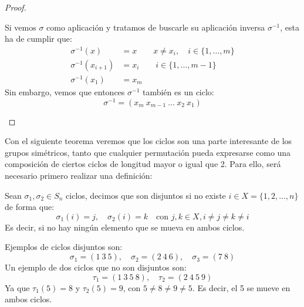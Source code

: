 \begin{prop}
\begin{proof}
\begin{enumerate}
                Si vemos $\sigma$ como aplicación y tratamos de buscarle su aplicación inversa $\sigma^{-1}$, esta ha de cumplir que:
                \begin{align*}
                    \sigma^{-1}(x) &= x \qquad x\neq x_i, \quad i \in \{1,\ldots,m\} \\
                    \sigma^{-1}(x_{i+1}) &= x_i \qquad i \in \{1,\ldots,m-1\} \\
                    \sigma^{-1}(x_1) &= x_m
                \end{align*}
                Sin embargo, vemos que entonces $\sigma^{-1}$ también es un ciclo:
                \begin{equation*}
                    \sigma^{-1} = (x_m\ x_{m-1}\ \ldots\ x_2\ x_1)
                \end{equation*}
        \end{enumerate}
    \end{proof}
\end{prop}

Con el siguiente teorema veremos que los ciclos son una parte interesante de los grupos simétricos, tanto que cualquier permutación pueda expresarse como una composición de ciertos ciclos de longitud mayor o igual que 2. Para ello, será necesario primero realizar una definición:

\begin{definicion}
    Sean $\sigma_1,\sigma_2\in S_n$ ciclos, decimos que son disjuntos si no existe $i \in X=\{1,2,\ldots,n\}$ de forma que:
    \begin{equation*}
        \sigma_1(i) = j, \quad \sigma_2(i) = k \quad \text{con\ } j,k \in X, i\neq j \neq k \neq i
    \end{equation*}
    Es decir, si no hay ningún elemento que se mueva en ambos ciclos.
\end{definicion}

\begin{ejemplo}
    Ejemplos de ciclos disjuntos son:
    \begin{equation*}
        \sigma_1 = (1\ 3\ 5), \quad \sigma_2 = (2\ 4\ 6), \quad \sigma_3 = (7\ 8)
    \end{equation*}
    Un ejemplo de dos ciclos que no son disjuntos son:
    \begin{equation*}
        \tau_1 = (1\ 3\ 5\ 8), \quad \tau_2 = (2\ 4\ 5\ 9)
    \end{equation*}
    Ya que $\tau_1(5) = 8$ y $\tau_2(5) = 9$, con $5\neq 8 \neq 9 \neq 5$. Es decir, el 5 se mueve en ambos ciclos.
\end{ejemplo}

